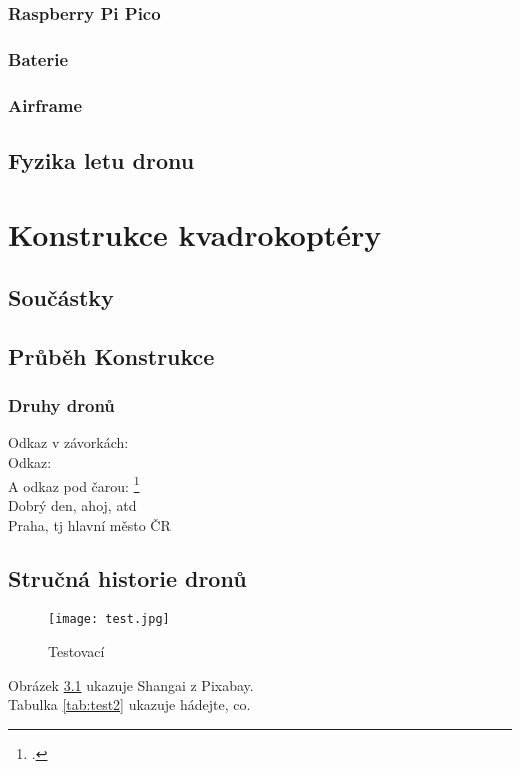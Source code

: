 \documentclass[12pt]{report}
\begin{document}
\section{Raspberry Pi Pico}


\section{Baterie}

\section{Airframe}


\lipsum[3]

\chapter{Fyzika letu dronu}

\lipsum[1]

\part{Konstrukce kvadrokoptéry} %

\chapter{Součástky}
\lipsum[1]	

\chapter{Průběh Konstrukce}

\lipsum[1]	

\section{Druhy dronů}
	Odkaz v závorkách: \parencite[see][page 900]{einstein}\\
	Odkaz: \cite{knuthwebsite}\\
	A odkaz pod čarou: \footcite[see][s. 42]{latexcompanion}\\
	Dobrý den, ahoj, \gls{atd}\\
	Praha, \gls{tj} hlavní město ČR
	



\chapter[Stručná historie dronů]{Stručná historie dronů}
\begin{figure}
  \texttt{[image: test.jpg]}
  \caption{Testovací}
  \label{fig:test}
\end{figure}
Obrázek \ref{fig:test} ukazuje Shangai z Pixabay.\\
Tabulka \ref{tab:test2} ukazuje hádejte, co.
	
\end{document}
